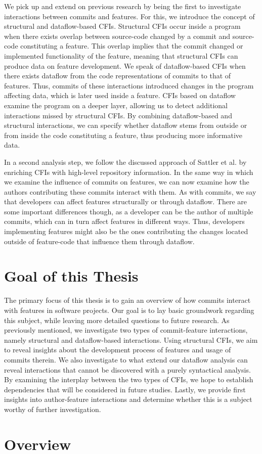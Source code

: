 We pick up and extend on previous research by being the first to investigate interactions between commits and features.
For this, we introduce the concept of structural and dataflow-based CFIs.
Structural CFIs occur inside a program when there exists overlap between source-code changed by a commit and source-code constituting a feature.
This overlap implies that the commit changed or implemented functionality of the feature, meaning that structural CFIs can produce data on feature development.
We speak of dataflow-based CFIs when there exists dataflow from the code representations of commits to that of features.
Thus, commits of these interactions introduced changes in the program affecting data, which is later used inside a feature.
CFIs based on dataflow examine the program on a deeper layer, allowing us to detect additional interactions missed by structural CFIs.
By combining dataflow-based and structural interactions, we can specify whether dataflow stems from outside or from inside the code constituting a feature, thus producing more informative data.

In a second analysis step, we follow the discussed approach of Sattler et al. by enriching CFIs with high-level repository information.
In the same way in which we examine the influence of commits on features, we can now examine how the authors contributing these commits interact with them.
As with commits, we say that developers can affect features structurally or through dataflow.
There are some important differences though, as a developer can be the author of multiple commits, which can in turn affect features in different ways.
Thus, developers implementing features might also be the ones contributing the changes located outside of feature-code that influence them through dataflow.

\section{Goal of this Thesis}

The primary focus of this thesis is to gain an overview of how commits interact with features in software projects. 
Our goal is to lay basic groundwork regarding this subject, while leaving more detailed questions to future research. 
As previously mentioned, we investigate two types of commit-feature interactions, namely structural and dataflow-based interactions. 
Using structural CFIs, we aim to reveal insights about the development process of features and usage of commits therein. 
We also investigate to what extend our dataflow analysis can reveal interactions that cannot be discovered with a purely syntactical analysis.
By examining the interplay between the two types of CFIs, we hope to establish dependencies that will be considered in future studies.
Lastly, we provide first insights into author-feature interactions and determine whether this is a subject worthy of further investigation.

\section{Overview}
